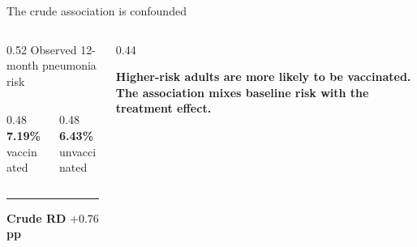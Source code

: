 \documentclass[aspectratio=169]{beamer}
\begin{document}
\begin{frame}{The crude association is confounded}
  \begin{columns}[T,onlytextwidth]
    \begin{column}{0.52\textwidth}
      {\large\color{black!55}Observed 12-month pneumonia risk}

      \vspace{0.25cm}
      \begin{columns}[T]
        \begin{column}{0.48\textwidth}
          {\fontsize{31}{34}\selectfont\bfseries\color{resultred}7.19\%}\\[-2pt]
          {\normalsize\color{black!55}vaccinated}
        \end{column}
        \begin{column}{0.48\textwidth}
          {\fontsize{31}{34}\selectfont\bfseries\color{slate}6.43\%}\\[-2pt]
          {\normalsize\color{black!55}unvaccinated}
        \end{column}
      \end{columns}

      \vspace{0.25cm}
      \hrule
      \vspace{0.15cm}
      {\small\bfseries\color{black!55}Crude RD}\hspace{0.3cm}%
      {\fontsize{21}{24}\selectfont\bfseries\color{resultred}
        \(+0.76\) pp}\par
    \end{column}
    \begin{column}{0.44\textwidth}
      {\footnotesize
        }

      \vspace{0.25cm}
      {\small\bfseries
        Higher-risk adults are more likely to be vaccinated. The association
        mixes baseline risk with the treatment effect.}
    \end{column}
  \end{columns}
\end{frame}
\end{document}
